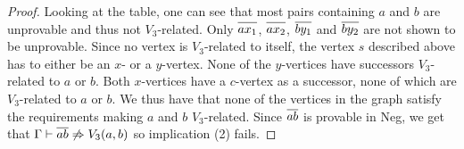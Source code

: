\begin{proof}
Looking at the table, one can see that most pairs containing $a$ and $b$ are unprovable and thus not $V_3$-related.
Only $\ol{ax_1}$, $\ol{ax_2}$, $\ol{by_1}$ and $\ol{by_2}$ are not shown to be unprovable.
Since no vertex is $V_3$-related to itself, the vertex $s$ described above has to either be an $x$- or a $y$-vertex.
None of the $y$-vertices have successors $V_3$-related to $a$ or $b$.
Both $x$-vertices have a $c$-vertex as a successor, none of which are $V_3$-related to $a$ or $b$.
We thus have that none of the vertices in the graph satisfy the requirements making $a$ and $b$ $V_3$-related.
Since $\ol{ab}$ is provable in Neg, we get that $\Gamma \vdash \ol{ab} \not \Rightarrow V_3(a,b)$ so implication (2) fails.
\end{proof}
